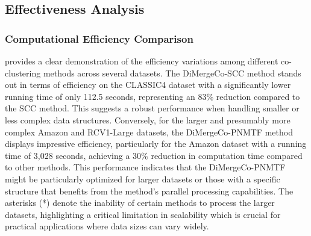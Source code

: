 \documentclass[journal]{IEEEtran}
\begin{document}
\subsection{Effectiveness Analysis}
\subsubsection{Computational Efficiency Comparison}
 provides a clear demonstration of the efficiency variations among different co-clustering methods across several datasets. The DiMergeCo-SCC method stands out in terms of efficiency on the CLASSIC4 dataset with a significantly lower running time of only 112.5 seconds, representing an 83\% reduction compared to the SCC method. This suggests a robust performance when handling smaller or less complex data structures. Conversely, for the larger and presumably more complex Amazon and RCV1-Large datasets, the DiMergeCo-PNMTF method displays impressive efficiency, particularly for the Amazon dataset with a running time of 3,028 seconds, achieving a 30\% reduction in computation time compared to other methods. This performance indicates that the DiMergeCo-PNMTF might be particularly optimized for larger datasets or those with a specific structure that benefits from the method's parallel processing capabilities. The asterisks (*) denote the inability of certain methods to process the larger datasets, highlighting a critical limitation in scalability which is crucial for practical applications where data sizes can vary widely.
\end{document}
